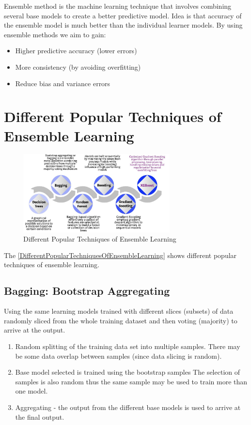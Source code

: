 \documentclass{article}
\begin{document}
Ensemble method is the machine learning technique that involves combining several base models to create a better predictive model. Idea is that accuracy of the ensemble model is much better than the individual learner models. By using ensemble methods we aim to gain:


\begin{itemize}
    \item Higher predictive accuracy (lower errors)
    \item More consistency (by avoiding overfitting)
    \item Reduce bias and variance errors
\end{itemize}

\section{Different Popular Techniques of Ensemble Learning}

\begin{figure}[H]
    \centering
    \includegraphics[width=8cm]{report-imgs/img1.jpeg}
    \caption{Different Popular Techniques of Ensemble Learning}
    \label{DifferentPopularTechniquesOfEnsembleLearning}
\end{figure}

The \autoref{DifferentPopularTechniquesOfEnsembleLearning} shows different popular techniques of ensemble learning. 

\subsection{Bagging: Bootstrap Aggregating}

Using the same learning models trained with different slices (subsets) of data randomly sliced from the whole training dataset and then voting (majority) to arrive at the output.


\begin{enumerate}
    \item Random splitting of the training data set into multiple samples. 
    There may be some data overlap between samples (since data slicing is random).
    \item Base model selected is trained using the bootstrap samples
    The selection of samples is also random thus the same sample may be used to train more than one model.
    \item Aggregating - the output from the different base models is used to arrive at the final output.
\end{enumerate}
\end{document}
